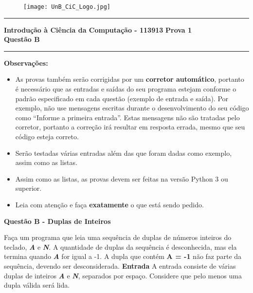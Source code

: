 \documentclass[a4paper, 12pt]{article}
\begin{document}
\begin{figure}[H]
	\texttt{[image: UnB\_CiC\_Logo.jpg]}
\end{figure}
\noindent\rule{\textwidth}{0.4pt}
\begin{center}
	\textbf{{\Large Introdução à Ciência da Computação - 113913}} \newline \newline
	\textbf{{\large Prova 1} \\
	\vspace{9pt}
	{\large Questão B}} \\
	\noindent\rule{\textwidth}{0.4pt}
	\newline
\end{center}

\textbf{{\large Observações:}}
\begin{itemize}
	\item As provas também serão corrigidas por um \textbf{corretor automático}, portanto é necessário que as entradas e saídas do seu programa estejam conforme o padrão especificado em cada questão (exemplo de entrada e saída). Por exemplo, não use mensagens escritas durante o desenvolvimento do seu código como “Informe a primeira entrada”. Estas mensagens não são tratadas pelo corretor, portanto a correção irá resultar em resposta errada, mesmo que seu código esteja correto.
	\item Serão testadas várias entradas além das que foram dadas como exemplo, assim como as listas.
	\item Assim como as listas, as provas devem ser feitas na versão Python 3 ou superior.
	\item Leia com atenção e faça \textbf{exatamente} o que está sendo pedido.
\end{itemize}
\newpage %
\begin{center}
\textbf{{\Large Questão B - Duplas de Inteiros}}
\end{center}
\vspace{5pt}
Faça um programa que leia uma sequência de duplas de números inteiros do teclado, \textbf{\textit{A}} e \textbf{\textit{N}}. A quantidade de duplas da sequência é desconhecida, mas ela termina quando \textbf{\textit{A}} for igual a -1. A dupla que contém \textbf{A = -1} não faz parte da sequência, devendo ser desconsiderada.
\newline \newline
\textbf{{\large Entrada}} \newline
A entrada consiste de várias duplas de inteiros \textbf{\textit{A}} e \textbf{\textit{N}}, separados por espaço. Considere que pelo menos uma dupla válida será lida.
\end{document}
